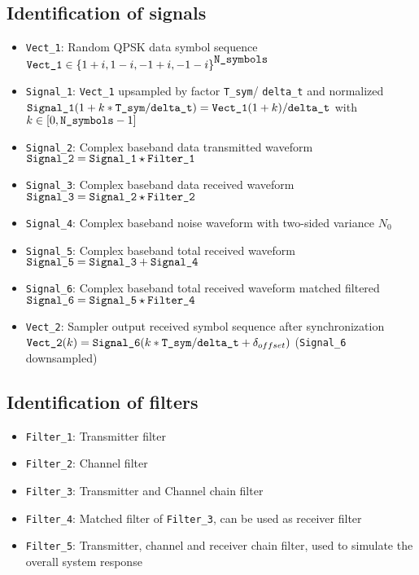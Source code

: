 \documentclass[a4paper]{article}
\begin{document}
\subsection{Identification of signals}
\begin{itemize}
  	\item \verb|Vect_1|: Random QPSK data symbol sequence\\ 
  $	\verb|Vect_1| \in {\{1+i, 1-i, -1+i, -1-i\}}^{\verb|N_symbols|} $
  	\item \verb|Signal_1|: \verb|Vect_1| upsampled by factor \verb|T_sym|/ \verb|delta_t| and normalized\\
  	$\verb|Signal_1|(1+k*\verb|T_sym|/ \verb|delta_t|)=\verb|Vect_1|(1+k)/ \verb|delta_t|$ with $k\in [0, \verb|N_symbols|-1]$
  	\item \verb|Signal_2|: Complex baseband data transmitted waveform\\
  	$\verb|Signal_2|=\verb|Signal_1|\star \verb|Filter_1|$
  	\item \verb|Signal_3|: Complex baseband data received waveform\\
  	$\verb|Signal_3|=\verb|Signal_2|\star \verb|Filter_2|$
  	\item \verb|Signal_4|: Complex baseband noise waveform with two-sided variance $N_0$ 
  	\item \verb|Signal_5|: Complex baseband total received waveform\\
  	$\verb|Signal_5|=\verb|Signal_3| + \verb|Signal_4|$
  	\item \verb|Signal_6|: Complex baseband total received waveform matched filtered\\
  	$\verb|Signal_6|=\verb|Signal_5|\star \verb|Filter_4|$
  	\item \verb|Vect_2|: Sampler output received symbol sequence after synchronization\\
  	$\verb|Vect_2|(k)= \verb|Signal_6|(k*\verb|T_sym|/ \verb|delta_t|+\delta_{offset})$ (\verb|Signal_6| downsampled)
\end{itemize}

\subsection{Identification of filters}
\begin{itemize}
	\item \verb|Filter_1|: Transmitter filter
	\item \verb|Filter_2|: Channel filter
	\item \verb|Filter_3|: Transmitter and Channel chain filter
	\item \verb|Filter_4|: Matched filter of \verb|Filter_3|, can be used as receiver filter
	\item \verb|Filter_5|: Transmitter, channel and receiver chain filter, used to simulate the overall system response
\end{itemize}
\end{document}
